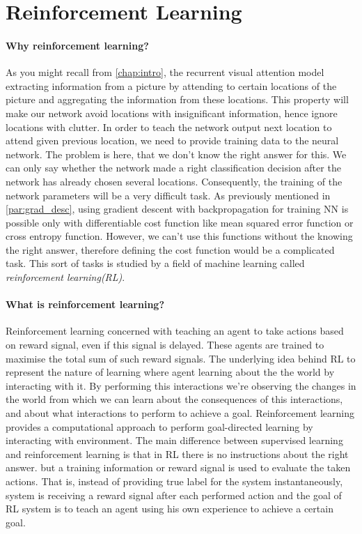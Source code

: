 
\section{Reinforcement Learning}
\paragraph{Why reinforcement learning?}
As you might recall from \autoref{chap:intro}, the recurrent visual attention model
extracting information from a picture by attending to certain locations of the picture
and aggregating the information from these locations. This property will make our network
avoid locations with insignificant information, hence ignore locations with clutter.
In order to teach the network
output next location to attend given previous location, we need to provide training data to
the neural network. The problem is here, that we don't know the right answer for this.
We can only say whether the network made a right classification decision after the network
has already chosen several locations. Consequently, the training of the network parameters will
be a very difficult task. As previously mentioned in \autoref{par:grad_desc}, using gradient descent
with backpropagation for training NN is possible only with differentiable cost function like
mean squared error function or cross entropy function. However, we can't use this functions without
the knowing the right answer, therefore defining the cost function would be a complicated task.
This sort of tasks is studied by a field of machine learning called \emph{reinforcement
learning(RL)}.

\paragraph{What is reinforcement learning?}
Reinforcement learning concerned with teaching an agent to take actions based on
reward signal, even if this signal is delayed.
These agents are trained to maximise the total
sum of such reward signals.
The underlying idea behind RL to
represent the nature of learning where agent learning about the the world by interacting
with it. By performing this interactions we're observing the changes in the world
from which we can learn about the consequences of this
interactions, and about what interactions to perform to achieve a goal.
Reinforcement learning provides a computational approach to perform goal-directed learning
by interacting with environment. The main difference between supervised learning and
reinforcement learning is that in RL there is no instructions about the right answer.
but a training information or reward signal is used to evaluate the taken actions.
That is, instead of providing true label for the system instantaneously,
system is receiving a reward signal
after each performed action and the goal of RL system is to teach an agent using his own
experience to achieve a certain goal.

